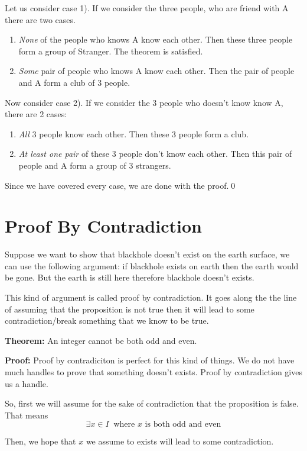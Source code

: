 \documentclass[a4paper, 12pt]{article}
\newcommand{\theorem}{\noindent\textbf{Theorem:} }
\renewcommand{\proof}{\noindent\textbf{Proof:} }
\newcommand{\qedd}{\qed\newline}
\theoremstyle{examplestyle}
\begin{document}
\begin{multicols}{2}
Let us consider case 1). If we consider the three people, who are friend with A there are two cases.
\begin{enumerate}[leftmargin=1in]
	\item[Case 1.1:] \emph{None} of the people who knows A know each other. Then these three people form a group of Stranger. The theorem is satisfied.
	\item[Case 1.2:] \emph{Some} pair of people who knows A know each other. Then the pair of people and A form a club of 3 people.
\end{enumerate}

Now consider case 2). If we consider the 3 people who doesn't know know A, there are 2 cases: 
\begin{enumerate} [leftmargin=1in]
	\item[Case 2.1] \emph{All} 3 people know each other. Then these 3 people form a club.
	\item[Case 2.2] \emph{At least one pair} of these 3 people don't know each other. Then this pair of people and A form a group of 3 strangers.
\end{enumerate}

Since we have covered every case, we are done with the proof.\qedd

\section*{Proof By Contradiction}
Suppose we want to show that blackhole doesn't exist on the earth surface, we can use the following argument: if blackhole exists on earth then the earth would be gone. But the earth is still here therefore blackhole doesn't exists.

This kind of argument is called proof by contradiction. It goes along the the line of assuming that the proposition is not true then it will lead to some contradiction/break something that we know to be true.

\noindent\theorem An integer cannot be both odd and even.

\noindent\proof Proof by contradiciton is perfect for this kind of things. We do not have much handles to prove that something doesn't exists. Proof by contradiction gives us a handle.

So, first we will assume for the sake of contradiction that the proposition is false. That means
\[
	\exists x \in I\;\;\text{where } x \text{ is both odd and even}
\]

Then, we hope that $x$ we assume to exists will lead to some contradiction.


\end{multicols}
\end{document}
